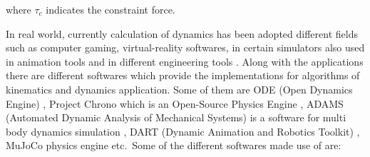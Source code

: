 where $\tau_{c}$ indicates the constraint force.
%
%
\par
	In real world, currently calculation of dynamics has been adopted different fields such as computer gaming, virtual-reality softwares, in certain simulators also used in animation tools and in different engineering tools \cite{featherstone2014rigid}. Along with the applications there are different softwares which provide the implementations for algorithms of kinematics and dynamics application. Some of them are ODE (Open Dynamics Engine) \cite{rsmith}, Project Chrono which is an Open-Source Physics Engine \cite{ProjectChrono} , ADAMS (Automated Dynamic Analysis of Mechanical Systems) is a software for multi body dynamics simulation \cite{adams}, DART (Dynamic Animation and Robotics Toolkit) \cite{dart}, MuJoCo physics engine \cite{todorov2012mujoco} etc.\ Some of the different softwares made use of are:
